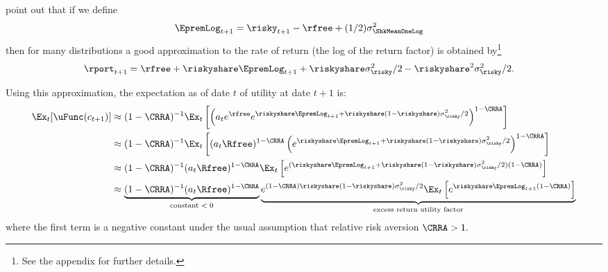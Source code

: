 \cite{cvAppendix} point out that if we define
\begin{equation}\begin{gathered}\begin{aligned}
  \EpremLog_{t+1} & =  \risky_{t+1}-\rfree + (1/2)\sigma^{2}_{\ShkMeanOneLog} \label{eq:eprem}
\end{aligned}\end{gathered}\end{equation}
then for many distributions a good approximation to the rate of return (the log of the return factor) is obtained by\footnote{See the appendix for further details.}
\begin{equation}\begin{gathered}\begin{aligned}
  \rport_{t+1} & =  \rfree+ \riskyshare \EpremLog_{t+1}+\riskyshare \sigma^{2}_{\risky}/2 - \riskyshare^{2}\sigma^{2}_{\risky}/2 \label{eq:rportCV}.
\end{aligned}\end{gathered}\end{equation}

Using this approximation, the expectation as of date $t$ of utility at date $t+1$ is:
\begin{equation}\label{eq:exputil}\begin{split}
  \Ex_{t}[\uFunc(c_{t+1})] & \approx  (1-\CRRA)^{-1}\Ex_{t}\left[\left(a_{t}e^{\rfree}e^{\riskyshare \EpremLog_{t+1}+\riskyshare(1-\riskyshare)\sigma^{2}_{\risky}/2 }\right)^{1-\CRRA}\right]
\\                      & \approx  (1-\CRRA)^{-1}\Ex_{t}\left[(a_{t}\Rfree)^{1-\CRRA}\left( e^{\riskyshare \EpremLog_{t+1}+\riskyshare(1-\riskyshare)\sigma^{2}_{\risky}/2 }\right)^{1-\CRRA}\right]
\\                      & \approx  (1-\CRRA)^{-1}(a_{t}\Rfree)^{1-\CRRA}\Ex_{t}\left[e^{(\riskyshare \EpremLog_{t+1}+\riskyshare(1-\riskyshare)\sigma^{2}_{\risky}/2)  (1-\CRRA)}\right]
\\                      & \approx  \underbrace{(1-\CRRA)^{-1}(a_{t}\Rfree)^{1-\CRRA}}_{\text{constant $< 0$}}\underbrace{e^{ (1-\CRRA)\riskyshare(1-\riskyshare)\sigma^{2}_{\risky}/2}\Ex_{t}\left[e^{\riskyshare \EpremLog_{t+1}  (1-\CRRA)}\right]}_{\text{excess return utility factor}}
 \end{split}
  \end{equation}
where the first term is a negative constant under the usual assumption that relative risk aversion $\CRRA>1.$

